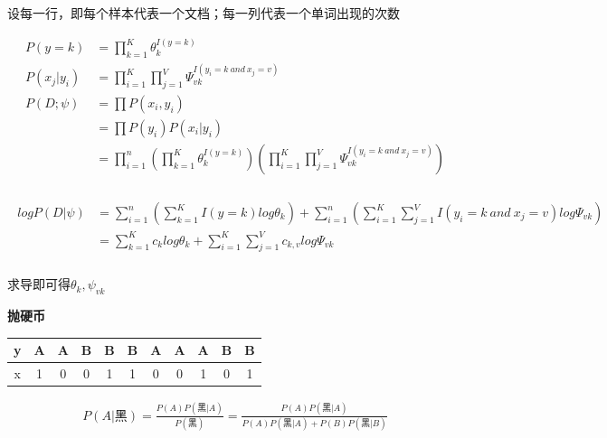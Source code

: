 \documentclass[UTF8]{ctexart}
\begin{document}
设每一行，即每个样本代表一个文档；每一列代表一个单词出现的次数

\begin{equation*}
    \begin{aligned}
        P(y=k)&=\prod^{K}_{k=1}\theta_k^{I(y=k)}\\
        P(x_j|y_i)&=\prod^{K}_{i=1}\prod^{V}_{j=1}\Psi_{vk}^{I(y_i=k ~and~x_j=v )}\\
        P(D;\psi)&=\prod P(x_i,y_i)\\
        &= \prod P(y_i)P(x_i|y_i)\\
        &= \prod_{i=1}^n(\prod^{K}_{k=1}\theta_k^{I(y=k)})(\prod^{K}_{i=1}\prod^{V}_{j=1}\Psi_{vk}^{I(y_i=k ~and~x_j=v )})\\
    \end{aligned}    
\end{equation*}


\begin{gather*}
        \begin{aligned}
        logP(D|\psi)&= \sum_{i=1}^n(\sum^{K}_{k=1}{I(y=k)}log\theta_k^{})+\sum_{i=1}^n(\sum^{K}_{i=1}\sum^{V}_{j=1}{I(y_i=k ~and~x_j=v )}log\Psi_{vk})\\
        &=\sum^{K}_{k=1}{c_k}log\theta_k^{}+\sum^{K}_{i=1}\sum^{V}_{j=1}{c_{k,v}}log\Psi_{vk}\\
        \end{aligned}
\end{gather*}


求导即可得$\theta_k,\psi_{vk}$


\dotfill

\textbf{抛硬币}
\begin{table}[htbp]
    \centering
    \begin{tabular}{c|c c c c c c c c c c }
         y & A & A & B & B & B & A & A & A & B & B  \\
         \hline
         x & 1 & 0 & 0 & 1 & 1 & 0 & 0 & 1 & 0 & 1 
    \end{tabular}
    \label{tab:coin}
\end{table}


$$
\begin{aligned}
P(A|黑)=\frac{P(A)P(黑|A)}{P(黑)}=\frac{P(A)P(黑|A)}{P(A)P(黑|A)+P(B)P(黑|B)}
\end{aligned}
$$
\end{document}
